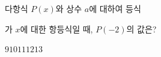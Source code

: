 다항식 $P(x)$와 상수 $a$에 대하여 등식\par\smallskip{}\par\smallskip\noindent 가 $x$에 대한 항등식일 때, $P(-2)$의 값은?
\begin{choices32}{$9$}{$10$}{$11$}{$12$}{$13$}\end{choices32}
